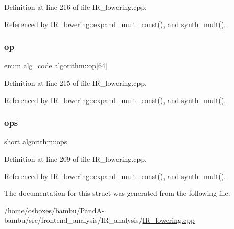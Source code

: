 Definition at line 216 of file I\+R\+\_\+lowering.\+cpp.



Referenced by I\+R\+\_\+lowering\+::expand\+\_\+mult\+\_\+const(), and synth\+\_\+mult().

\mbox{\label{structalgorithm_a40a99025611a19da97892bf8cba574b1}} 
\subsubsection{\texorpdfstring{op}{op}}
{\footnotesize\ttfamily enum \hyperlink{IR__lowering_8cpp_aaf531dce3659d448e57b2c73d1c415c4}{alg\+\_\+code} algorithm\+::op\mbox{[}64\mbox{]}}



Definition at line 215 of file I\+R\+\_\+lowering.\+cpp.



Referenced by I\+R\+\_\+lowering\+::expand\+\_\+mult\+\_\+const(), and synth\+\_\+mult().

\mbox{\label{structalgorithm_a2ad8f16e1aa5d2ab270a40ba50320fe5}} 
\subsubsection{\texorpdfstring{ops}{ops}}
{\footnotesize\ttfamily short algorithm\+::ops}



Definition at line 209 of file I\+R\+\_\+lowering.\+cpp.



Referenced by I\+R\+\_\+lowering\+::expand\+\_\+mult\+\_\+const(), and synth\+\_\+mult().



The documentation for this struct was generated from the following file\+:\begin{DoxyCompactItemize}
\item 
/home/osboxes/bambu/\+Pand\+A-\/bambu/src/frontend\+\_\+analysis/\+I\+R\+\_\+analysis/\hyperlink{IR__lowering_8cpp}{I\+R\+\_\+lowering.\+cpp}\end{DoxyCompactItemize}
